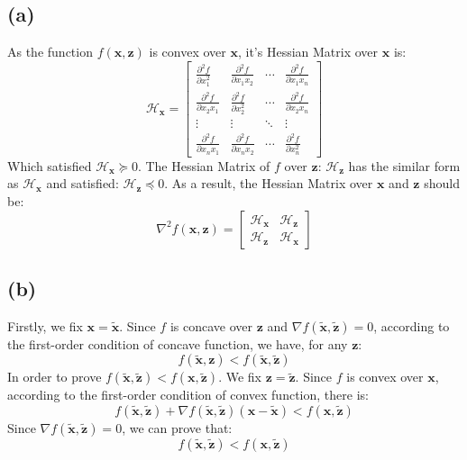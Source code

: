 \documentclass[10pt,a4paper]{article}
\begin{document}
\subsection*{(a)}
As the function $f(\mathbf{x}, \mathbf{z})$ is convex over $\mathbf{x}$, it's Hessian Matrix over $\mathbf{x}$ is:
\begin{equation*}
	\mathcal{H}_{\mathbf{x}} = \begin{bmatrix}
	\frac{\partial^{2} f}{\partial x_{1}^{2}} & \frac{\partial^{2} f}{\partial x_{1} x_{2}} & \cdots & \frac{\partial^{2} f}{\partial x_{1} x_{n}} \\
	\frac{\partial^{2} f}{\partial x_{2} x_{1}} & \frac{\partial^{2} f}{\partial x_{2}^{2}} & \cdots & \frac{\partial^{2} f}{\partial x_{2} x_{n}} \\
	\vdots & \vdots & \ddots & \vdots \\
	\frac{\partial^{2} f}{\partial x_{n} x_{1}} & \frac{\partial^{2} f}{\partial x_{n} x_{2}} & \cdots & \frac{\partial^{2} f}{\partial x_{n}^{2}}
	\end{bmatrix}
\end{equation*}
Which satisfied $\mathcal{H}_{\mathbf{x}} \succeq 0$. The Hessian Matrix of $f$ over $\mathbf{z}$: $\mathcal{H}_{\mathbf{z}}$ has the similar form as $\mathcal{H}_{\mathbf{x}}$ and satisfied: $\mathcal{H}_{\mathbf{z}} \preceq 0$. As a result, the Hessian Matrix over $\mathbf{x}$ and $\mathbf{z}$ should be:
\begin{equation*}
	\nabla^{2} f(\mathbf{x}, \mathbf{z}) = \begin{bmatrix}
	\mathcal{H}_{\mathbf{x}} & \mathcal{H}_{\mathbf{z}} \\
	\mathcal{H}_{\mathbf{z}} & \mathcal{H}_{\mathbf{x}}
	\end{bmatrix}
\end{equation*}

\subsection*{(b)}
Firstly, we fix $\mathbf{x} = \tilde{\mathbf{x}}$. Since $f$ is concave over $\mathbf{z}$ and $\nabla f(\tilde{\mathbf{x}}, \tilde{\mathbf{z}}) = 0$, according to the first-order condition of concave function, we have, for any $\mathbf{z}$:
\begin{equation}
	f(\tilde{\mathbf{x}}, \mathbf{z}) < f(\tilde{\mathbf{x}}, \tilde{\mathbf{z}})
	\label{11}
\end{equation}
In order to prove $f(\tilde{\mathbf{x}}, \tilde{\mathbf{z}}) < f(\mathbf{x}, \tilde{\mathbf{z}})$. We fix $\mathbf{z} = \tilde{\mathbf{z}}$. Since $f$ is convex over $\mathbf{x}$, according to the first-order condition of convex function, there is:
\begin{equation*}
	f(\tilde{\mathbf{x}}, \tilde{\mathbf{z}}) + \nabla f(\tilde{\mathbf{x}}, \tilde{\mathbf{z}}) (\mathbf{x} - \tilde{\mathbf{x}}) < f(\mathbf{x}, \tilde{\mathbf{z}})
\end{equation*}
Since $\nabla f(\tilde{\mathbf{x}}, \tilde{\mathbf{z}}) = 0$, we can prove that:
\begin{equation*}
	f(\tilde{\mathbf{x}}, \tilde{\mathbf{z}}) < f(\mathbf{x}, \tilde{\mathbf{z}})
\end{equation*}
\end{document}

